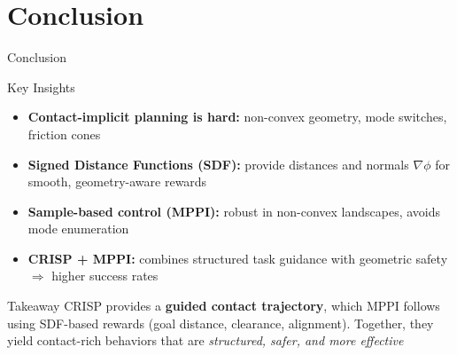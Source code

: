 \documentclass[10pt, aspectratio=169]{beamer}
\begin{document}
\section{Conclusion}
\begin{frame}{Conclusion}
  \begin{block}{Key Insights}
    \begin{itemize}
      \item \textbf{Contact-implicit planning is hard:}  
            non-convex geometry, mode switches, friction cones
      \item \textbf{Signed Distance Functions (SDF):}  
            provide distances and normals $\nabla \phi$ for smooth, geometry-aware rewards
      \item \textbf{Sample-based control (MPPI):}  
            robust in non-convex landscapes, avoids mode enumeration
      \item \textbf{CRISP + MPPI:}  
            combines structured task guidance with geometric safety
            $\Rightarrow$ higher success rates
    \end{itemize}
  \end{block}

  \vspace{0.5em}

  \begin{block}{Takeaway}
    CRISP provides a \textbf{guided contact trajectory}, which MPPI follows using SDF-based rewards (goal distance, clearance, alignment). Together, they yield contact-rich behaviors that are \emph{structured, safer, and more effective}
  \end{block}
\end{frame}

\end{document}
